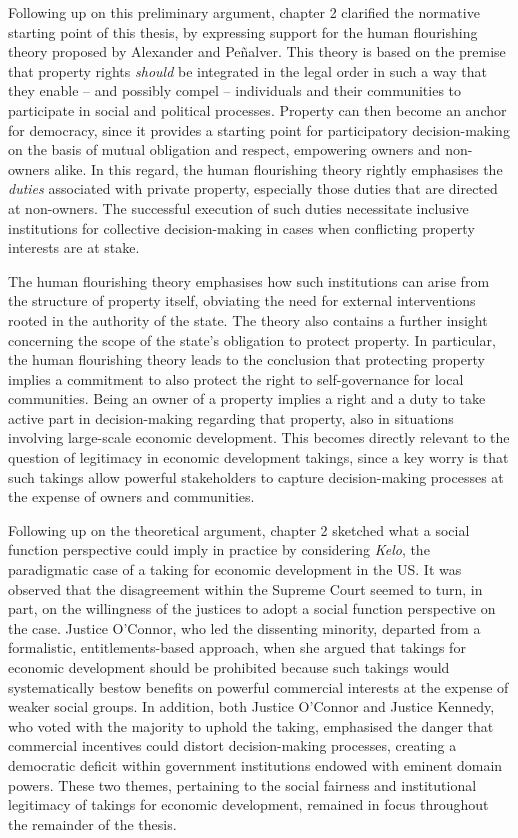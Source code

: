 Following up on this preliminary argument, chapter 2 clarified the normative starting point of this thesis, by expressing support for the human flourishing theory proposed by Alexander and Pe\~{n}alver. This theory is based on the premise that property rights {\it should} be integrated in the legal order in such a way that they enable -- and possibly compel -- individuals and their communities to participate in social and political processes. Property can then become an anchor for democracy, since it provides a starting point for participatory decision-making on the basis of mutual obligation and respect, empowering owners and non-owners alike. In this regard, the human flourishing theory rightly emphasises the {\it duties} associated with private property, especially those duties that are directed at non-owners. The successful execution of such duties necessitate inclusive institutions for collective decision-making in cases when conflicting property interests are at stake.

The human flourishing theory emphasises how such institutions can arise from the structure of property itself, obviating the need for external interventions rooted in the authority of the state. The theory also contains a further insight concerning the scope of the state's obligation to protect property. In particular, the human flourishing theory leads to the conclusion that protecting property implies a commitment to also protect the right to self-governance for local communities. Being an owner of a property implies a right and a duty to take active part in decision-making regarding that property, also in situations involving large-scale economic development. This becomes directly relevant to the question of legitimacy in economic development takings, since a key worry is that such takings allow powerful stakeholders to capture decision-making processes at the expense of owners and communities.

Following up on the theoretical argument, chapter 2 sketched what a social function perspective could imply in practice by considering {\it Kelo}, the paradigmatic case of a taking for economic development in the US. It was observed that the disagreement within the Supreme Court seemed to turn, in part, on the willingness of the justices to adopt a social function perspective on the case. Justice O'Connor, who led the dissenting minority, departed from a formalistic, entitlements-based approach, when she argued that takings for economic development should be prohibited because such takings would systematically bestow benefits on powerful commercial interests at the expense of weaker social groups. In addition, both Justice O'Connor and Justice Kennedy, who voted with the majority to uphold the taking, emphasised the danger that commercial incentives could distort decision-making processes, creating a democratic deficit within government institutions endowed with eminent domain powers. These two themes, pertaining to the social fairness and institutional legitimacy of takings for economic development, remained in focus throughout the remainder of the thesis.

